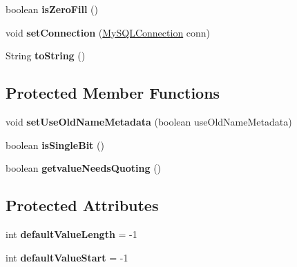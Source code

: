 \begin{DoxyCompactItemize}
\item 
\mbox{\label{classcom_1_1mysql_1_1jdbc_1_1_field_a01d06144fa58130305baf98140090a4d}} 
boolean {\bfseries is\+Zero\+Fill} ()
\item 
\mbox{\label{classcom_1_1mysql_1_1jdbc_1_1_field_a7bca1d208b26d256b21fbc779890c4ec}} 
void {\bfseries set\+Connection} (\mbox{\hyperlink{interfacecom_1_1mysql_1_1jdbc_1_1_my_s_q_l_connection}{My\+S\+Q\+L\+Connection}} conn)
\item 
\mbox{\label{classcom_1_1mysql_1_1jdbc_1_1_field_ad90a92f7cf8d098372b55f46d233c727}} 
String {\bfseries to\+String} ()
\end{DoxyCompactItemize}
\subsection*{Protected Member Functions}
\begin{DoxyCompactItemize}
\item 
\mbox{\label{classcom_1_1mysql_1_1jdbc_1_1_field_a4de4f4bcacffcf46e4218dc22b44b9ff}} 
void {\bfseries set\+Use\+Old\+Name\+Metadata} (boolean use\+Old\+Name\+Metadata)
\item 
\mbox{\label{classcom_1_1mysql_1_1jdbc_1_1_field_a58b17e3be58838f64ef6be781a31a1a8}} 
boolean {\bfseries is\+Single\+Bit} ()
\item 
\mbox{\label{classcom_1_1mysql_1_1jdbc_1_1_field_aafaa32d75f3317743a01654939cdf28e}} 
boolean {\bfseries getvalue\+Needs\+Quoting} ()
\end{DoxyCompactItemize}
\subsection*{Protected Attributes}
\begin{DoxyCompactItemize}
\item 
\mbox{\label{classcom_1_1mysql_1_1jdbc_1_1_field_a210faadc90da343727c3a779b72220e9}} 
int {\bfseries default\+Value\+Length} = -\/1
\item 
\mbox{\label{classcom_1_1mysql_1_1jdbc_1_1_field_a70b13eac5786d02e5d5dbcc996271999}} 
int {\bfseries default\+Value\+Start} = -\/1
\end{DoxyCompactItemize}


